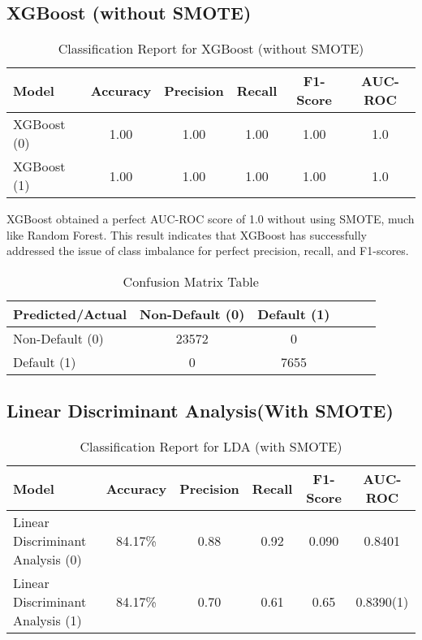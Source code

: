 \documentclass[12pt, a4paper,oneside]{book}
\numberwithin{equation}{section}
\begin{document}
\subsection{XGBoost (without SMOTE)}

\begin{table}[h!]
\centering
\begin{tabular}{|l|c|c|c|c|c|}
\hline
\textbf{Model} & \textbf{Accuracy} & \textbf{Precision} & \textbf{Recall} & \textbf{F1-Score} & \textbf{AUC-ROC} \\ \hline
XGBoost (0) & 1.00 & 1.00 & 1.00 & 1.00 &1.0 \\ \hline
XGBoost (1) & 1.00 & 1.00 & 1.00 & 1.00 &1.0 \\ \hline
\end{tabular}
\caption{Classification Report for XGBoost (without SMOTE)}
\end{table}

XGBoost obtained a perfect AUC-ROC score of 1.0 without using SMOTE, much like Random Forest. This result indicates that XGBoost has successfully addressed the issue of class imbalance for perfect precision, recall, and F1-scores.
\begin{table}[h!]
\centering
\begin{tabular}{|l|c|c|c|c|c|}
\hline
\textbf{Predicted/Actual} & \textbf{Non-Default (0)} & \textbf{	Default (1)} \\ \hline
Non-Default (0) & 23572 & 0  \\ \hline
Default (1) & 0 & 7655  \\ \hline
\end{tabular}
\caption{Confusion Matrix Table}
\end{table}



\subsection{Linear Discriminant Analysis(With SMOTE)}
\begin{table}[h!]
\centering
\begin{tabular}{|l|c|c|c|c|c|}
\hline
\textbf{Model} & \textbf{Accuracy} & \textbf{Precision} & \textbf{Recall} & \textbf{F1-Score} & \textbf{AUC-ROC} \\ \hline
Linear Discriminant Analysis (0)& 84.17\% & 0.88& 0.92& 0.090 &0.8401 \\ \hline
Linear Discriminant Analysis (1) & 84.17\% & 0.70& 0.61& 0.65 &0.8390(1) \\ \hline
\end{tabular}
\caption{Classification Report for LDA (with SMOTE)}
\end{table}
\end{document}
